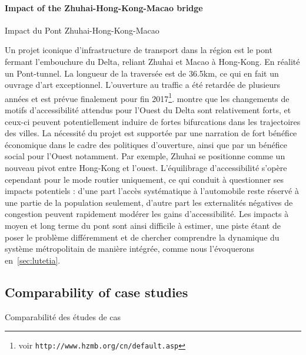 \paragraph{Impact of the Zhuhai-Hong-Kong-Macao bridge}{Impact du Pont Zhuhai-Hong-Kong-Macao}

Un projet iconique d'infrastructure de transport dans la région est le pont fermant l'embouchure du Delta, reliant Zhuhai et Macao à Hong-Kong. En réalité un Pont-tunnel. La longueur de la traversée est de 36.5km, ce qui en fait un ouvrage d'art exceptionnel. L'ouverture au traffic a été retardée de plusieurs années et est prévue finalement pour fin 2017\footnote{voir \texttt{http://www.hzmb.org/cn/default.asp}}. \cite{zhou2016medium} montre que les changements de motifs d'accessibilité attendus pour l'Ouest du Delta sont relativement forts, et ceux-ci peuvent potentiellement induire de fortes bifurcations dans les trajectoires des villes. La nécessité du projet est supportée par une narration de fort bénéfice économique dans le cadre des politiques d'ouverture, ainsi que par un bénéfice social pour l'Ouest notamment. Par exemple, Zhuhai se positionne comme un nouveau pivot entre Hong-Kong et l'ouest. L'équilibrage d'accessibilité s'opère cependant pour le mode routier uniquement, ce qui conduit à questionner ses impacts potentiels : d'une part l'accès systématique à l'automobile reste réservé à une partie de la population seulement, d'autre part les externalités négatives de congestion peuvent rapidement modérer les gains d'accessibilité. Les impacts à moyen et long terme du pont sont ainsi difficile à estimer, une piste étant de poser le problème différemment et de chercher comprendre la dynamique du système métropolitain de manière intégrée, comme nous l'évoquerons en~\ref{sec:lutetia}.







\subsection{Comparability of case studies}{Comparabilité des études de cas}


